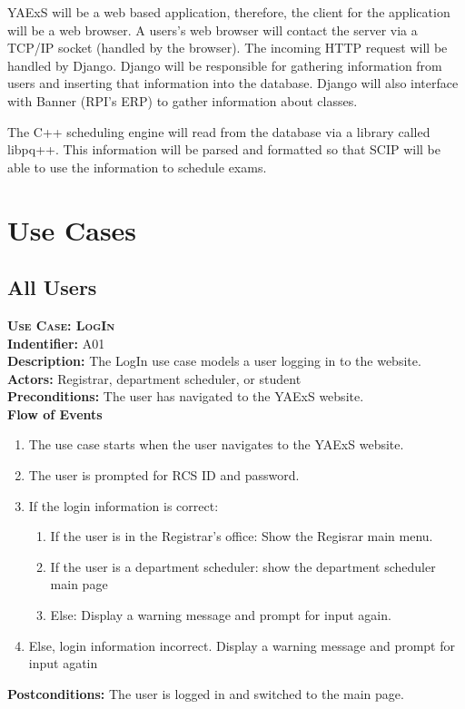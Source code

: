 \documentclass[11pt]{article}
\newcounter{id}
\newenvironment{usecase}{%
	\def\title##1{ {\large \bfseries  \scshape {Use Case:} ##1} \\ }
 	\def\id##1{{\bf Indentifier:} ##1\\}
	\def\des##1{ {\bf Description:} ##1\\}
	\def\actors##1{ {\bf Actors:} ##1\\}
    	\def\pre##1{ {\bf Preconditions:} ##1 \\} %
    	\def\flow##1{ {\bf Flow of Events} ##1}%
    	\newenvironment{ucenum}{%
        	\begin{enumerate}[nolistsep]\small}%
        	{\end{enumerate}}
	\def\post##1{ {\bf Postconditions:} ##1 \\}
}{\vspace{.05in}}
\begin{document}
YAExS will be a web based application, therefore, the client for the application will be a web browser.  A users's web browser will contact the server via a TCP/IP socket (handled by the browser).  The incoming HTTP request will be handled by Django.  Django will be responsible for gathering information from users and inserting that information into the database.  Django will also interface with Banner (RPI's ERP) to gather information about classes.

The C++ scheduling engine will read from the database via a library called libpq++.  This information will be parsed and formatted so that SCIP will be able to use the information to schedule exams.


\section{Use Cases} %

\subsection{All Users}
\begin{usecase}
  \title{LogIn}
  \id{A01}
  \des{The LogIn use case models a user logging in to the website.}
  \actors{Registrar, department scheduler, or student}
  \pre{The user has navigated to the YAExS website.}
  \flow{}
  \begin{ucenum}
  \item The use case starts when the user navigates to the YAExS website.
  \item The user is prompted for RCS ID and password.
  \item If the login information is correct:
    \begin{ucenum}
    \item If the user is in the Registrar's office: Show the Regisrar main menu.
    \item If the user is a department scheduler: show the department scheduler main page
    \item Else: Display a warning message and prompt for input again.
    \end{ucenum}
  \item Else, login information incorrect. Display a warning message and prompt for input agatin
  \end{ucenum}
  \post{The user is logged in and switched to the main page.}
\end{usecase}
\end{document}
